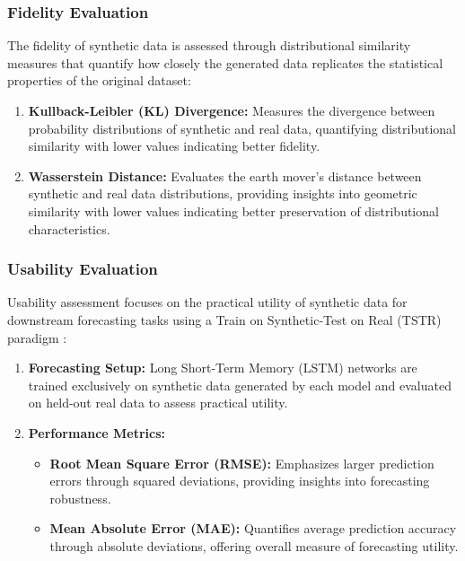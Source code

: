 \documentclass[11pt]{article}
\begin{document}
\subsubsection{Fidelity Evaluation}
The fidelity of synthetic data is assessed through distributional similarity measures that quantify how closely the generated data replicates the statistical properties of the original dataset:

\begin{enumerate}
    \item \textbf{Kullback-Leibler (KL) Divergence:} Measures the divergence between probability distributions of synthetic and real data, quantifying distributional similarity with lower values indicating better fidelity.
    
    \item \textbf{Wasserstein Distance:} Evaluates the earth mover's distance between synthetic and real data distributions, providing insights into geometric similarity with lower values indicating better preservation of distributional characteristics.
\end{enumerate}

\subsubsection{Usability Evaluation}
Usability assessment focuses on the practical utility of synthetic data for downstream forecasting tasks using a Train on Synthetic-Test on Real (TSTR) paradigm \Parencite{HERNANDEZ202228}:

\begin{enumerate}
    \item \textbf{Forecasting Setup:} Long Short-Term Memory (LSTM) networks are trained exclusively on synthetic data generated by each model and evaluated on held-out real data to assess practical utility.
    
    \item \textbf{Performance Metrics:} 
    \begin{itemize}
        \item \textbf{Root Mean Square Error (RMSE):} Emphasizes larger prediction errors through squared deviations, providing insights into forecasting robustness.
        \item \textbf{Mean Absolute Error (MAE):} Quantifies average prediction accuracy through absolute deviations, offering overall measure of forecasting utility.
    \end{itemize}
\end{enumerate}
\end{document}
